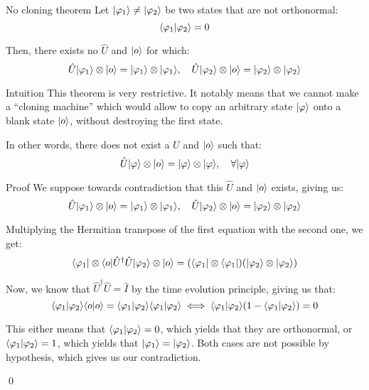 \documentclass[a4paper]{article}
\begin{document}
\begin{parag}{No cloning theorem}
    Let $\ket{\phi_1} \neq \ket{\phi_2}$ be two states that are not orthonormal: 
    \[\braket{\phi_1}{\phi_2} = 0\]
    
    Then, there exists no $\hat{U}$ and $\ket{o}$ for which: 
    \[\hat{U} \ket{\phi_1} \otimes \ket{o} = \ket{\phi_1} \otimes \ket{\phi_1}, \mathspace \hat{U} \ket{\phi_2} \otimes \ket{o} = \ket{\phi_2} \otimes \ket{\phi_2}\]

    \begin{subparag}{Intuition}
        This theorem is very restrictive. It notably means that we cannot make a ``cloning machine'' which would allow to copy an arbitrary state $\ket{\phi}$ onto a blank state $\ket{o}$, without destroying the first state.

        In other words, there does not exist a $\hat{U}$ and $\ket{o}$ such that:
        \[\hat{U} \ket{\phi} \otimes \ket{o} = \ket{\phi} \otimes \ket{\phi}, \mathspace \forall \ket{\phi}\]
    \end{subparag}

    \begin{subparag}{Proof}
        We suppose towards contradiction that this $\hat{U}$ and $\ket{o}$ exists, giving us:
        \[\hat{U} \ket{\phi_1} \otimes \ket{o} = \ket{\phi_1} \otimes \ket{\phi_1}, \mathspace \hat{U} \ket{\phi_2} \otimes \ket{o} = \ket{\phi_2} \otimes \ket{\phi_2}\]

        Multiplying the Hermitian transpose of the first equation with the second one, we get: 
        \[\bra{\phi_1} \otimes \bra{o} \hat{U}^{\dagger} \hat{U} \ket{\phi_2} \otimes \ket{o} = \left(\bra{\phi_1} \otimes \bra{\phi_1}\right)\left(\ket{\phi_2} \otimes \ket{\phi_2}\right)\]
        
        Now, we know that $\hat{U}^{\dagger} \hat{U} = \hat{I}$ by the time evolution principle, giving us that: 
        \[\braket{\phi_1}{\phi_2} \braket{o}{o} = \braket{\phi_1}{\phi_2}\braket{\phi_1}{\phi_2} \iff \braket{\phi_1}{\phi_2}\left(1 - \braket{\phi_1}{\phi_2}\right) = 0\]
        
        This either means that $\braket{\phi_1}{\phi_2} = 0$, which yields that they are orthonormal, or $\braket{\phi_1}{\phi_2} = 1$, which yields that $\ket{\phi_1} = \ket{\phi_2}$. Both cases are not possible by hypothesis, which gives us our contradiction.

        \qed
    \end{subparag}
\end{parag}
\end{document}
